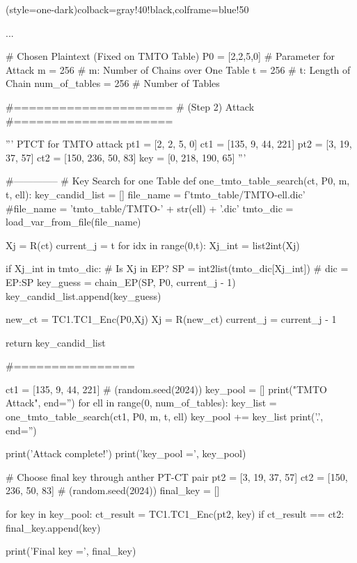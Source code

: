 \newpage
\begin{python}(style=one-dark){colback=gray!40!black,colframe=blue!50}

...

# Chosen Plaintext (Fixed on TMTO Table)
P0 = [2,2,5,0]
# Parameter for Attack
m = 256             # m: Number of Chains over One Table
t = 256             # t: Length of Chain
num_of_tables = 256 # Number of Tables

#=====================
# (Step 2) Attack
#=====================

''' 
PTCT for TMTO attack
pt1 = [2, 2, 5, 0]
ct1 = [135, 9, 44, 221]
pt2 = [3, 19, 37, 57]
ct2 = [150, 236, 50, 83]
key = [0, 218, 190, 65]
'''

#--------------
# Key Search for one Table
def one_tmto_table_search(ct, P0, m, t, ell):
   key_candid_list = []
   file_name = f'tmto_table/TMTO-{ell}.dic'
   #file_name = 'tmto_table/TMTO-' + str(ell) + '.dic'
   tmto_dic = load_var_from_file(file_name)

   Xj = R(ct)
   current_j = t
   for idx in range(0,t):
      Xj_int = list2int(Xj)

      if Xj_int in tmto_dic: # Is Xj in EP?
         SP = int2list(tmto_dic[Xj_int]) # dic = { EP:SP }
         key_guess = chain_EP(SP, P0, current_j - 1)
         key_candid_list.append(key_guess)

      new_ct = TC1.TC1_Enc(P0,Xj)
      Xj = R(new_ct)
      current_j = current_j - 1

   return key_candid_list


#================

ct1 = [135, 9, 44, 221] # (random.seed(2024))
key_pool = []
print("TMTO Attack", end='')
for ell in range(0, num_of_tables):
   key_list = one_tmto_table_search(ct1, P0, m, t, ell)
   key_pool += key_list
   print('.', end='')

print('\n Attack complete!\n')
print('key_pool =', key_pool)

# Choose final key through anther PT-CT pair
pt2 = [3, 19, 37, 57]
ct2 = [150, 236, 50, 83] # (random.seed(2024))
final_key = []

for key in key_pool:
   ct_result = TC1.TC1_Enc(pt2, key)
   if ct_result == ct2:
   final_key.append(key)

print('Final key =', final_key)   
\end{python}
\newpage